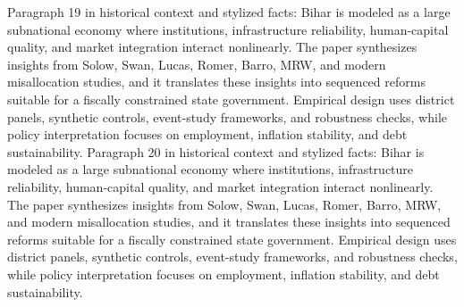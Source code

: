 \documentclass[preprint,12pt]{elsarticle}
\begin{document}
Paragraph 19 in historical context and stylized facts: Bihar is modeled as a large subnational economy where institutions, infrastructure reliability, human-capital quality, and market integration interact nonlinearly. The paper synthesizes insights from Solow, Swan, Lucas, Romer, Barro, MRW, and modern misallocation studies, and it translates these insights into sequenced reforms suitable for a fiscally constrained state government. Empirical design uses district panels, synthetic controls, event-study frameworks, and robustness checks, while policy interpretation focuses on employment, inflation stability, and debt sustainability.
Paragraph 20 in historical context and stylized facts: Bihar is modeled as a large subnational economy where institutions, infrastructure reliability, human-capital quality, and market integration interact nonlinearly. The paper synthesizes insights from Solow, Swan, Lucas, Romer, Barro, MRW, and modern misallocation studies, and it translates these insights into sequenced reforms suitable for a fiscally constrained state government. Empirical design uses district panels, synthetic controls, event-study frameworks, and robustness checks, while policy interpretation focuses on employment, inflation stability, and debt sustainability.
\end{document}
